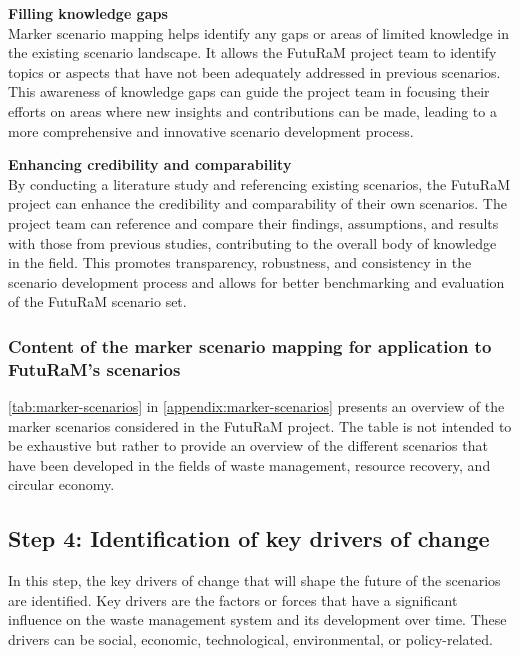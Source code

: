 \textbf{Filling knowledge gaps}\\
Marker scenario mapping helps identify any gaps or areas of limited knowledge in the existing scenario landscape. It allows the FutuRaM project team to identify topics or aspects that have not been adequately addressed in previous scenarios. This awareness of knowledge gaps can guide the project team in focusing their efforts on areas where new insights and contributions can be made, leading to a more comprehensive and innovative scenario development process.



\textbf{Enhancing credibility and comparability}\\
By conducting a literature study and referencing existing scenarios, the FutuRaM project can enhance the credibility and comparability of their own scenarios. The project team can reference and compare their findings, assumptions, and results with those from previous studies, contributing to the overall body of knowledge in the field. This promotes transparency, robustness, and consistency in the scenario development process and allows for better benchmarking and evaluation of the FutuRaM scenario set.



\subsubsection{Content of the marker scenario mapping for application to FutuRaM's scenarios}

\autoref{tab:marker-scenarios} in \autoref{appendix:marker-scenarios} presents an overview of the marker scenarios considered in the FutuRaM project. The table is not intended to be exhaustive but rather to provide an overview of the different scenarios that have been developed in the fields of waste management, resource recovery, and circular economy.



\subsection{Step 4: Identification of key drivers of change}

In this step, the key drivers of change that will shape the future of the scenarios are identified. Key drivers are the factors or forces that have a significant influence on the waste management system and its development over time. These drivers can be social, economic, technological, environmental, or policy-related.

